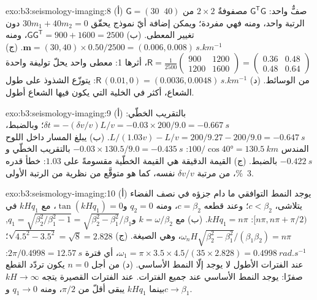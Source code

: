 \begin{solution}{exo:b3:seismology-imaging:8}
(أ) $\mathsf G = (30\;\;40)$ صفٌّ واحد: $\mathsf G^{\mathsf T}\mathsf G$ مصفوفةٌ
$2\times2$ من الرتبة واحد، ومنه فهي مفردة؛ ويمكن إضافة أيّ نموذج يحقّق $30m_1 + 40m_2 = 0$
دون تغيير المعطى. (ب) $\mathsf G\mathsf G^{\mathsf T} =
900 + 1600 = 2500$، ومنه $\mathbf m = (30, 40)\times0.50/2500 =
(0.006, 0.008)\,\unit{s.km^{-1}}$. (ج) $\mathsf R = \frac{1}{2500}
\begin{pmatrix} 900 & 1200 \\ 1200 & 1600 \end{pmatrix} =
\begin{pmatrix} 0.36 & 0.48 \\ 0.48 & 0.64 \end{pmatrix}$، أثرها 1: معطى
واحد يحلّ توليفة واحدة من الوسائط. (د) $\mathsf R\,(0.01, 0) =
(0.0036, 0.0048)\,\unit{s.km^{-1}}$: يتوزّع الشذوذ على طول الشعاع، أكثر
في الخلية التي يكون فيها الشعاع أطول.
\end{solution}

\begin{solution}{exo:b3:seismology-imaging:9}
(أ) بالتقريب الخطّي: $\delta t = -(\delta v/v)L/v = -0.03\times200/9.0 =
\qty{-0.667}{s}$؛ وبالضبط، $L/(1.03v) - L/v = 200/9.27 - 200/9.0 =
\qty{-0.647}{s}$. (ب) يبلغ المسار داخل اللوح المندس $100/\cos\ang{40} =
\qty{130.5}{km}$: $-0.03\times130.5/9.0 = \qty{-0.435}{s}$ بالتقريب الخطّي
و$\qty{-0.422}{s}$ بالضبط. (ج) القيمة الدقيقة هي القيمة الخطّية مقسومةً على
$1.03$: خطأ قدره \qty{3}{\percent}، من مرتبة $\delta v/v$ نفسه، كما
هو متوقَّع من نظرية من الرتبة الأولى.
\end{solution}

\begin{solution}{exo:b3:seismology-imaging:10}
(أ) يوجد النمط التوافقي ما دام جزؤه في نصف الفضاء يتلاشى، $c < \beta_2$؛ وعند
قطعه $c = \beta_2$، ومنه $q_2 = 0$ و$\tan(kHq_1) = 0$، مع $kHq_1$ في
$[n\pi, n\pi + \pi/2)$: $kHq_1 = n\pi$. (ب) مع $k = \omega/\beta_2$
و$q_1 = \sqrt{\beta_2^2/\beta_1^2 - 1} = \sqrt{\beta_2^2 - \beta_1^2}/\beta_1$,
$\omega_nH\sqrt{\beta_2^2 - \beta_1^2}/(\beta_1\beta_2) = n\pi$، وهي
الصيغة. (ج) $\sqrt{4.5^2 - 3.5^2} = \sqrt8 = 2.828$؛ $\omega_1 =
\pi\times3.5\times4.5/(35\times2.828) = \qty{0.4998}{rad.s^{-1}}$، أي فترة
$2\pi/0.4998 = \qty{12.57}{s}$: عند الفترات الأطول لا يوجد إلّا النمط
الأساسي. (د) من أجل $n = 0$ يكون تردّد القطع صفرًا: يوجد النمط
الأساسي عند جميع الفترات. عند الفترات القصيرة يتجه $kH \to \infty$ بينما $kHq_1$ يبقى
أقلّ من $\pi/2$، ومنه $q_1 \to 0$ و$c \to \beta_1$.
\end{solution}


